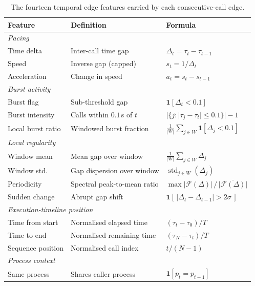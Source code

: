 \documentclass[%
    BCOR=10mm,
    DIV=13,
    toc=bibliography,
    toc=listof,
    oneside,
    12pt,
]{scrbook}
\begin{document}
\begin{table}[H]
\centering
\small
\caption[Temporal edge features]{The fourteen temporal edge features carried by each
consecutive-call edge.}
\label{tab:temporal_features}
\begin{tabular}{lll}
\toprule
\textbf{Feature} & \textbf{Definition} & \textbf{Formula} \\
\midrule
\multicolumn{3}{l}{\textit{Pacing}} \\
Time delta        & Inter-call time gap          & $\Delta_t=\tau_t-\tau_{t-1}$ \\
Speed             & Inverse gap (capped)         & $s_t=1/\Delta_t$ \\
Acceleration      & Change in speed              & $a_t=s_t-s_{t-1}$ \\
\midrule
\multicolumn{3}{l}{\textit{Burst activity}} \\
Burst flag        & Sub-threshold gap            & $\mathbf{1}[\Delta_t<0.1]$ \\
Burst intensity   & Calls within $0.1$\,s of $t$ & $|\{j:|\tau_j-\tau_t|\le 0.1\}|-1$ \\
Local burst ratio & Windowed burst fraction      & $\tfrac{1}{|W|}\sum_{j\in W}\mathbf{1}[\Delta_j<0.1]$ \\
\midrule
\multicolumn{3}{l}{\textit{Local regularity}} \\
Window mean       & Mean gap over window         & $\tfrac{1}{|W|}\sum_{j\in W}\Delta_j$ \\
Window std.       & Gap dispersion over window   & $\operatorname{std}_{j\in W}(\Delta_j)$ \\
Periodicity       & Spectral peak-to-mean ratio  & $\max|\mathcal{F}(\Delta)|\,/\,\overline{|\mathcal{F}(\Delta)|}$ \\
Sudden change     & Abrupt gap shift             & $\mathbf{1}[\,|\Delta_t-\Delta_{t-1}|>2\sigma\,]$ \\
\midrule
\multicolumn{3}{l}{\textit{Execution-timeline position}} \\
Time from start   & Normalised elapsed time      & $(\tau_t-\tau_0)/T$ \\
Time to end       & Normalised remaining time    & $(\tau_N-\tau_t)/T$ \\
Sequence position & Normalised call index        & $t/(N-1)$ \\
\midrule
\multicolumn{3}{l}{\textit{Process context}} \\
Same process      & Shares caller process        & $\mathbf{1}[p_t=p_{t-1}]$ \\
\bottomrule
\end{tabular}
\end{table}
\end{document}
